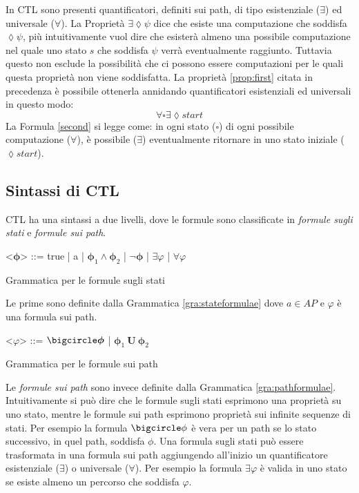 \documentclass[a4paper, 10pt]{article}
\numberwithin{equation}{theor}
\begin{document}
In \ac{CTL} sono presenti quantificatori, definiti sui path, di tipo esistenziale ($\exists$) ed universale ($\forall$). La Proprietà $\exists\lozenge \psi$ dice che esiste una computazione che soddisfa $\lozenge\psi$, più intuitivamente vuol dire che esisterà almeno una possibile computazione nel quale uno stato $s$ che soddisfa $\psi$ verrà eventualmente raggiunto. Tuttavia questo non esclude la possibilità che ci possono essere computazioni per le quali questa proprietà non viene soddisfatta.
La proprietà \ref{prop:first} citata in precedenza è possibile ottenerla annidando quantificatori esistenziali ed universali in questo modo:
\begin{equation}
\label{second}
\forall\square\exists\lozenge start
\end{equation}
La Formula \eqref{second} si legge come: in ogni stato ($\square$) di ogni possibile computazione ($\forall$), è possibile ($\exists$) eventualmente ritornare in uno stato iniziale ($\lozenge start$).


\subsection{Sintassi di \ac{CTL}}
\ac{CTL} ha una sintassi a due livelli, dove le formule sono classificate in \textit{formule sugli stati} e \textit{formule sui path}.

\begin{Grammar}
	\begin{grammar}

	\centering
	<$\boldsymbol{\phi}$> ::= true | a | $\boldsymbol{\phi}_{1} \wedge \boldsymbol{\phi}_{2}$ | $\neg \boldsymbol{\phi}$ | $	\exists \varphi$ | $\forall \varphi$

	\end{grammar}
	\caption{Grammatica per le formule sugli stati}\label{gra:stateformulae}
\end{Grammar}
Le prime sono definite dalla Grammatica \ref{gra:stateformulae} dove $a \in AP$ e $\varphi$ è una formula sui path.
\begin{Grammar}
	\begin{grammar}

	\centering
	<$\varphi$> ::= $\bigcircle \boldsymbol{\phi}$ | $\boldsymbol{\phi}_{1}\ \boldsymbol{U}\  \boldsymbol{\phi}_{2}$

	\end{grammar}
	\caption{Grammatica per le formule sui path}\label{gra:pathformulae}
\end{Grammar}
Le \textit{formule sui path} sono invece definite dalla Grammatica \ref{gra:pathformulae}.
Intuitivamente si può dire che le formule sugli stati esprimono una proprietà su uno stato, mentre le formule sui path esprimono proprietà sui infinite sequenze di stati. Per esempio la formula $\bigcircle \phi$ è vera per un path se lo stato successivo, in quel path, soddisfa $\phi$. Una formula sugli stati può essere trasformata in una formula sui path aggiungendo all'inizio un quantificatore esistenziale ($\exists$) o universale ($\forall$). Per esempio la formula $\exists \varphi$ è valida in uno stato se esiste almeno un percorso che soddisfa $\varphi$.
\end{document}
